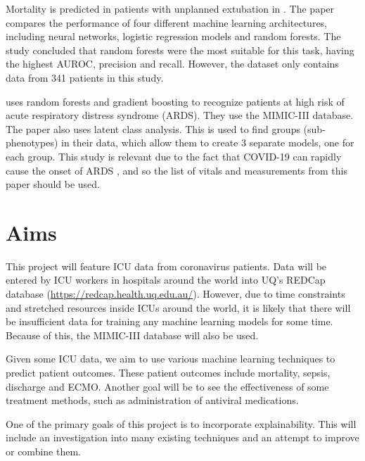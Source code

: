 \documentclass[12pt]{article}
\begin{document}
Mortality is predicted in patients with unplanned extubation in \cite{CompareFourML}. The paper compares the performance of four different machine learning architectures, including neural networks, logistic regression models and random forests. The study concluded that random forests were the most suitable for this task, having the highest AUROC, precision and recall. However, the dataset only contains data from 341 patients in this study.

\cite{ARDSML} uses random forests and gradient boosting to recognize patients at high risk of acute respiratory distress syndrome (ARDS). They use the MIMIC-III database. The paper also uses latent class analysis. This is used to find groups (sub-phenotypes) in their data, which allow them to create 3 separate models, one for each group. This study is relevant due to the fact that COVID-19 can rapidly cause the onset of ARDS \cite{CoronaARDS}, and so the list of vitals and measurements from this paper should be used. 





\section{Aims}
This project will feature ICU data from coronavirus patients. Data will be entered by ICU workers in hospitals around the world into UQ's REDCap database (\url{https://redcap.health.uq.edu.au/}). However, due to time constraints and stretched resources inside ICUs around the world, it is likely that there will be insufficient data for training any machine learning models for some time. Because of this, the MIMIC-III database will also be used.

Given some ICU data, we aim to use various machine learning techniques to predict patient outcomes. These patient outcomes include mortality, sepsis, discharge and ECMO. Another goal will be to see the effectiveness of some treatment methods, such as administration of antiviral medications. 

One of the primary goals of this project is to incorporate explainability. This will include an investigation into many existing techniques and an attempt to improve or combine them.
\end{document}
